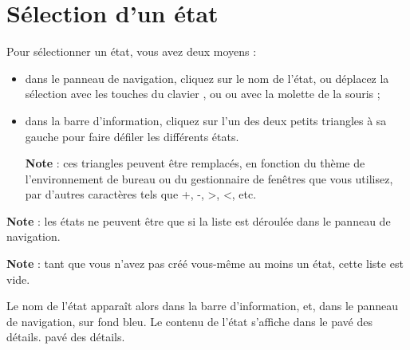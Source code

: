 

\section{Sélection d'un état\label{reports-selection}}


Pour sélectionner un état, vous avez deux moyens :

\begin{itemize}
	 \item dans le panneau de navigation, cliquez sur le nom de l'état, ou déplacez la sélection avec les touches du clavier  ,   ou  ou avec la molette de la souris ;
	 \item  dans la barre d'information, cliquez sur l'un des deux petits triangles à sa gauche pour faire défiler les différents états.

	 \textbf{Note} : ces triangles peuvent être remplacés, en fonction du thème de l'environnement de bureau ou du gestionnaire de fenêtres que vous utilisez, par d'autres caractères tels que +, -, >, <, etc.
\end{itemize}

	\textbf{Note} : les états ne peuvent être  que si la liste est déroulée dans le panneau de navigation.

\textbf{Note} : tant que vous n'avez pas créé vous-même au moins un état, cette liste est vide.

Le nom de l'état apparaît alors dans la barre d'information, et, dans le panneau de navigation, sur fond bleu{\couleur}. Le contenu de l'état s'affiche dans le \ifIllustration pavé des détails.
\else pavé des détails.
\fi

